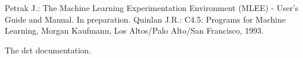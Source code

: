 \documentclass[a4paper,10pt,twoside]{article}
\begin{document}


\begin{thebibliography}{99}
  Petrak J.: The Machine Learning Experimentation Environment (MLEE) -
    User's Guide and Manual. In preparation.
  Quinlan J.R.: C4.5: Programs for Machine Learning, Morgan Kaufmann, Los
  Altos/Palo Alto/San Francisco, 1993.

  The dct documentation.

\end{thebibliography}
\end{document}
